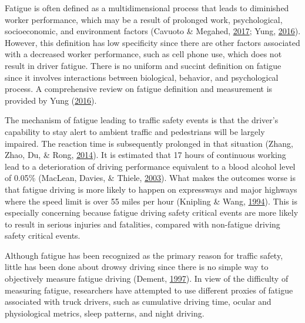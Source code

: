 \documentclass[12pt]{book}
\numberwithin{equation}{chapter}
\begin{document}
Fatigue is often defined as a multidimensional process that leads to diminished worker performance, which may be a result of prolonged work, psychological, socioeconomic, and environment factors (Cavuoto \& Megahed, \protect\hyperlink{ref-cavuoto2017understanding}{2017}; Yung, \protect\hyperlink{ref-yung2016fatigue}{2016}). However, this definition has low specificity since there are other factors associated with a decreased worker performance, such as cell phone use, which does not result in driver fatigue. There is no uniform and succint definition on fatigue since it involves interactions between biological, behavior, and psychological process. A comprehensive review on fatigue definition and measurement is provided by Yung (\protect\hyperlink{ref-yung2016fatigue}{2016}).

The mechanism of fatigue leading to traffic safety events is that the driver's capability to stay alert to ambient traffic and pedestrians will be largely impaired. The reaction time is subsequently prolonged in that situation (Zhang, Zhao, Du, \& Rong, \protect\hyperlink{ref-zhang2014study}{2014}). It is estimated that 17 hours of continuous working lead to a deterioration of driving performance equivalent to a blood alcohol level of 0.05\% (MacLean, Davies, \& Thiele, \protect\hyperlink{ref-maclean2003hazards}{2003}). What makes the outcomes worse is that fatigue driving is more likely to happen on expressways and major highways where the speed limit is over 55 miles per hour (Knipling \& Wang, \protect\hyperlink{ref-knipling1994crashes}{1994}). This is especially concerning because fatigue driving safety critical events are more likely to result in serious injuries and fatalities, compared with non-fatigue driving safety critical events.

Although fatigue has been recognized as the primary reason for traffic safety, little has been done about drowsy driving since there is no simple way to objectively measure fatigue driving (Dement, \protect\hyperlink{ref-dement1997perils}{1997}). In view of the difficulty of measuring fatigue, researchers have attempted to use different proxies of fatigue associated with truck drivers, such as cumulative driving time, ocular and physiological metrics, sleep patterns, and night driving.
\end{document}
